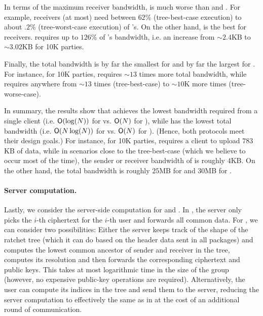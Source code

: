 In terms of the maximum receiver bandwidth, \protITK is much worse than \saik and \protCMPKE. For
example, \saik receivers (at most) need between $62\%$ (tree-best-case execution) to about $.2\%$ (tree-worst-case
execution) of \protITK's. On the other hand, \protCMPKE is the best for receivers.  \saik requires up
to $126\%$ of \protCMPKE's bandwidth, i.e. an increase from $\sim 2.4$KB to $\sim 3.02$KB for 10K parties.

Finally, the total bandwidth is by far the smallest for \protCMPKE and by far the largest for \protITK. For instance, for 10K parties, \saik requires $\sim13$ times more total bandwidth, while \protITK requires anywhere from $\sim13$ times (tree-best-case) to $\sim10$K more times (tree-worse-case).

In summary, the results show that \saik achieves the lowest bandwidth required from a single client
(i.e. $\textsf{O}(\log(N))$ for \saik vs. $\textsf{O}(N)$ for \protCMPKE), while \protCMPKE has the lowest total bandwidth
(i.e. $\textsf{O}(N\log(N))$ for \saik vs. $\textsf{O}(N)$ for \protCMPKE). (Hence, both protocols meet their design goals.) For instance, for 10K parties, \protCMPKE requires a client to upload $783$KB of data, while in scenarios close to the tree-best-case (which we believe to occur most of the time), the sender or receiver bandwidth of \saik is roughly $4$KB. On the other hand, the total bandwidth is roughly $25$MB for \protCMPKE and $30$MB for \saik.

\paragraph{Server computation.}
Lastly, we consider the server-side computation for \saik and \protCMPKE. In \protCMPKE, the server only picks the
$i$-th \mPKE ciphertext for the $i$-th user and forwards all common data. For \saik, we can consider two possibilities:
Either the server keeps track of the shape of the ratchet tree (which it can do based on the header data sent in all
packages) and computes the lowest common ancestor of sender and receiver in the tree, computes its resolution and then
forwards the corresponding ciphertext and public keys. This takes at most logarithmic time in the size of the
group (however, no expensive public-key operations are required). Alternatively, the user can compute its indices in the
tree and send them to the server, reducing the server computation to effectively the same as in \protCMPKE at the cost
of an additional round of communication.

